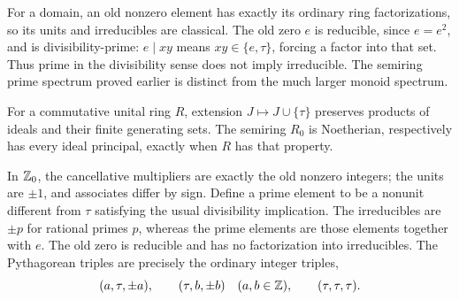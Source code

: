 For a domain, an old nonzero element has exactly its ordinary ring
factorizations, so its units and irreducibles are classical. The old
zero $e$ is reducible, since $e=e^2$, and is divisibility-prime: $e\mid xy$
means $xy\in\{e,\tau\}$, forcing a factor into that set. Thus prime in the
divisibility sense does not imply irreducible. The semiring prime spectrum
proved earlier is distinct from the much larger monoid spectrum.

\begin{proposition}
\label{prop:integer-arithmetic}
For a commutative unital ring $R$, extension $J\mapsto J\cup\{\tau\}$
preserves products of ideals and their finite generating sets. The
semiring $R_0$ is Noetherian, respectively has every ideal principal,
exactly when $R$ has that property.

In $\mathbb Z_0$, the cancellative multipliers are exactly the old nonzero
integers; the units are $\pm1$, and associates differ by sign. Define a
prime element to be a nonunit different from $\tau$ satisfying the usual
divisibility implication. The irreducibles are $\pm p$ for rational
primes $p$, whereas the prime elements are those elements together with
$e$. The old zero is reducible and has no factorization into irreducibles.
The Pythagorean triples are precisely the ordinary integer triples,
\[
 (a,\tau,\pm a),\qquad(\tau,b,\pm b)\quad(a,b\in\mathbb Z),
 \qquad(\tau,\tau,\tau).
\]
\end{proposition}
